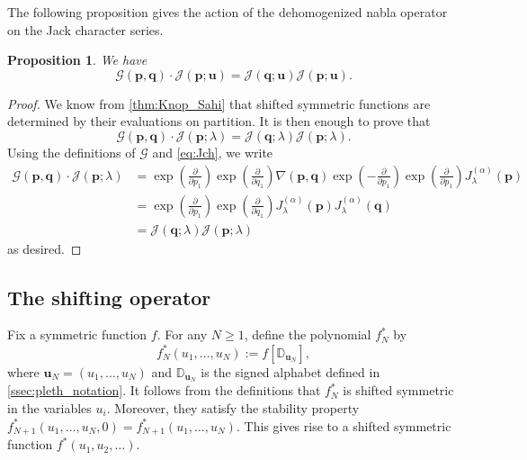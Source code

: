 \documentclass[12pt]{amsart}
\newtheorem{prop}[thm]{Proposition}
\theoremstyle{remark}
\newcommand{\bfp}{\boldsymbol{p}}
\newcommand{\bfq}{\boldsymbol{q}}
\newcommand{\bfu}{\boldsymbol{u}}
\newcommand{\J}{{J}^{(\alpha)}}
\newcommand{\G}{\mathcal G}
\newcommand{\bD}{\mathbb D}
\newcommand{\mcJ}{\mathcal{J}}
\begin{document}
The following proposition gives the action of the dehomogenized nabla operator on the Jack character series.
\begin{prop}\label{prop:G_mcJ}
    We have
    $$\G(\bfp,\bfq)\cdot \mcJ(\bfp;\bfu)=\mcJ(\bfq;\bfu)\mcJ(\bfp;\bfu).$$
\end{prop}
\begin{proof}

    We know from \cref{thm:Knop_Sahi} that shifted symmetric functions are determined by their evaluations on partition. It is then enough to prove that 
    $$\G(\bfp,\bfq)\cdot \mcJ(\bfp;\lambda)=\mcJ(\bfq;\lambda)\mcJ(\bfp;\lambda).$$
    Using the definitions of $\G$ and \cref{eq:Jch}, we write
    \begin{align*}
        \G(\bfp,\bfq)\cdot \mcJ(\bfp;\lambda)
        &=\exp\left(\frac{\partial}{\partial p_1}\right)\exp\left(\frac{\partial}{\partial q_1}\right)
\nabla(\bfp,\bfq)
\exp\left(-\frac{\partial}{\partial p_1}\right)\exp\left(\frac{\partial}{\partial p_1}\right)\J_\lambda(\bfp)\\
&=\exp\left(\frac{\partial}{\partial p_1}\right)\exp\left(\frac{\partial}{\partial q_1}\right)
\J_\lambda(\bfp)\J_\lambda(\bfq)\\
&=\mcJ(\bfq;\lambda)\mcJ(\bfp;\lambda)
    \end{align*}
    as desired.
\end{proof}



\subsection{The shifting operator}
Fix a symmetric function $f$.
For any $N\geq 1$, define the polynomial $f^*_N$ by
\begin{equation}\label{eq:fstar_N}
  f^*_N(u_1,\dots,u_N):=f[\bD_{\bfu_N}],  
\end{equation}
where $\bfu_N=(u_1,\dots,u_N)$ and $\bD_{\bfu_N}$ is the signed alphabet defined in \cref{ssec:pleth_notation}. It follows from the definitions that $f^*_N$ is shifted symmetric in the variables $u_i$. Moreover, they satisfy the stability property
$f^*_{N+1}(u_1,\dots,u_{N},0)=f^*_{N+1}(u_1,\dots,u_{N}).$
This gives rise to a shifted symmetric function $f^*(u_1,u_2,\dots)$.
\end{document}
